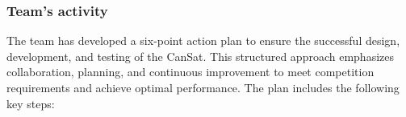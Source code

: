 \begin{itemize}[leftmargin=*]
    
    
    
    
    
    
\end{itemize}

\subsubsection{Team's activity} 

The team has developed a six-point action plan to ensure the successful design, development, and testing of the CanSat. This structured approach emphasizes collaboration, planning, and continuous improvement to meet competition requirements and achieve optimal performance. The plan includes the following key steps:
